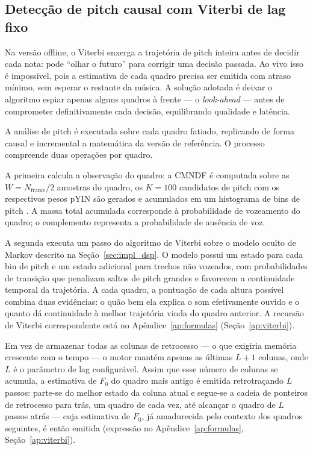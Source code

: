 \subsection{Detecção de pitch causal com Viterbi de lag fixo}

Na versão offline, o Viterbi enxerga a trajetória de pitch inteira antes de decidir cada nota: pode ``olhar o futuro'' para corrigir uma decisão passada. Ao vivo isso é impossível, pois a estimativa de cada quadro precisa ser emitida com atraso mínimo, sem esperar o restante da música. A solução adotada é deixar o algoritmo espiar apenas alguns quadros à frente --- o \textit{look-ahead} --- antes de comprometer definitivamente cada decisão, equilibrando qualidade e latência.

A análise de pitch é executada sobre cada quadro fatiado, replicando de forma causal e incremental a matemática da versão de referência. O processo compreende duas operações por quadro.

A primeira calcula a observação do quadro: a CMNDF é computada sobre as $W = N_{\text{frame}}/2$ amostras do quadro, os $K = 100$ candidatos de pitch com os respectivos pesos pYIN são gerados e acumulados em um histograma de bins de pitch \cite{mauch2014pyin}. A massa total acumulada corresponde à probabilidade de vozeamento do quadro; o complemento representa a probabilidade de ausência de voz.

A segunda executa um passo do algoritmo de Viterbi sobre o modelo oculto de Markov descrito na Seção~\ref{sec:impl_dsp}. O modelo possui um estado para cada bin de pitch e um estado adicional para trechos não vozeados, com probabilidades de transição que penalizam saltos de pitch grandes e favorecem a continuidade temporal da trajetória. A cada quadro, a pontuação de cada altura possível combina duas evidências: o quão bem ela explica o som efetivamente ouvido e o quanto dá continuidade à melhor trajetória vinda do quadro anterior. A recursão de Viterbi correspondente está no Apêndice~\ref{ap:formulas} (Seção~\ref{ap:viterbi}).

Em vez de armazenar todas as colunas de retrocesso --- o que exigiria memória crescente com o tempo --- o motor mantém apenas as últimas $L + 1$ colunas, onde $L$ é o parâmetro de lag configurável. Assim que esse número de colunas se acumula, a estimativa de $F_0$ do quadro mais antigo é emitida retrotraçando $L$ passos: parte-se do melhor estado da coluna atual e segue-se a cadeia de ponteiros de retrocesso para trás, um quadro de cada vez, até alcançar o quadro de $L$ passos atrás --- cuja estimativa de $F_0$, já amadurecida pelo contexto dos quadros seguintes, é então emitida (expressão no Apêndice~\ref{ap:formulas}, Seção~\ref{ap:viterbi}).

